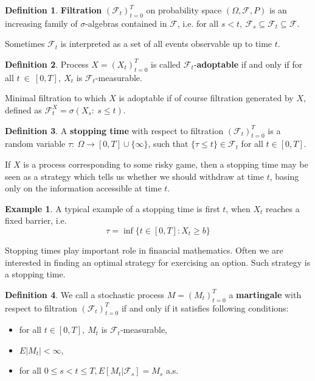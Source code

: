 \documentclass[a4paper,12pt]{article}
\theoremstyle{definition}
\newtheorem{mydef}{Definition}[section]
\newtheorem{example}{Example}[section]
\theoremstyle{remark}
\begin{document}
\begin{mydef}
 \textbf{Filtration} $(\mathcal{F}_t)_{t=0}^T$ on probability space $(\Omega, \mathcal{F}, {P})$ is an increasing family of $\sigma$-algebras contained in $\mathcal{F}$, i.e. for all $s<t,\ \mathcal{F}_s \subseteq \mathcal{F}_t \subseteq \mathcal{F}$.
\end{mydef}
\noindent Sometimes $\mathcal{F}_t$ is interpreted as a set of all events observable up to time $t$.

\begin{mydef}
 Process $X=(X_t)_{t=0}^T$ is called $\mathcal{F}_t$-\textbf{adoptable} if and only if for all $t~\in~[0,T],\ X_t$ is $\mathcal{F}_t$-measurable.
\end{mydef}
\noindent Minimal filtration to which $X$ is adoptable if of course filtration generated by $X$, defined as $\mathcal{F}_t^X = \sigma(X_s:\ s \leq t)$.

\begin{mydef}
 A \textbf{stopping time} with respect to filtration $(\mathcal{F}_t)_{t=0}^T$ is a random variable $\tau:\ \Omega \rightarrow [0,T]\cup\{\infty\}$, such that $\{\tau \leq t\} \in \mathcal{F}_t$ for all $t \in [0,T]$.
\end{mydef}
If $X$ is a process corresponding to some risky game, then a stopping time may be seen as a strategy which tells us whether we should withdraw at time $t$, basing only on the information accessible at time $t$.
\begin{example}
 A typical example of a stopping time is first $t$, when $X_t$ reaches a fixed barrier, i.e.
 \[\tau = \inf\{t\in[0,T]: X_t \geq b\}\]
\end{example}
\noindent Stopping times play important role in financial mathematics. Often we are interested in finding an optimal strategy for exercising an option. Such strategy is a stopping time.

\begin{mydef}
 We call a stochastic process $M=(M_t)_{t=0}^T$ a \textbf{martingale} with respect to filtration $(\mathcal{F}_t)_{t=0}^T$ if and only if it satisfies following conditions:
 \begin{itemize}
  \item for all $t \in [0,T],\ M_t$ is $\mathcal{F}_t$-measurable,
  \item $E|M_t| < \infty$,
  \item for all $0 \leq s < t \leq T, E[M_t|\mathcal{F}_s] = M_s$  a.s.
 \end{itemize}
\end{mydef}
\end{document}
